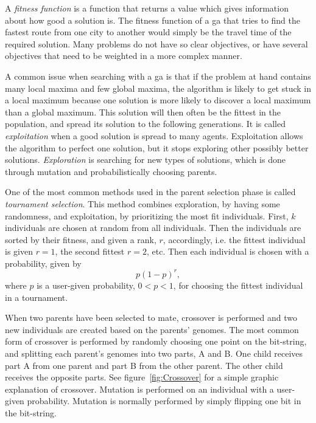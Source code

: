 A \textit{fitness function} is a function that returns a value which gives information about how good a solution is. The fitness function of a \ac{ga} that tries to find the fastest route from one city to another would simply be the travel time of the required solution. Many problems do not have so clear objectives, or have several objectives that need to be weighted in a more complex manner.

A common issue when searching with a \ac{ga} is that if the problem at hand contains many local maxima and few global maxima, the algorithm is likely to get stuck in a local maximum because one solution is more likely to discover a local maximum than a global maximum. This solution will then often be the fittest in the population, and spread its solution to the following generations. It is called \textit{exploitation} when a good solution is spread to many agents. Exploitation allows the algorithm to perfect one solution, but it stops exploring other possibly better solutions. \textit{Exploration} is searching for new types of solutions, which is done through mutation and probabilistically choosing parents. 

One of the most common methods used in the parent selection phase is called \textit{tournament selection}. This method combines exploration, by having some randomness, and exploitation, by prioritizing the most fit individuals. First, $k$ individuals are chosen at random from all individuals. Then the individuals are sorted by their fitness, and given a rank, $r$, accordingly, i.e. the fittest individual is given $r=1$, the second fittest $r=2$, etc. Then each individual is chosen with a probability, given by
\begin{equation}
p(1-p)^r,
\end{equation}
where $p$ is a user-given probability, $0 < p < 1$, for choosing the fittest individual in a tournament. 

When two parents have been selected to mate, crossover is performed and two new individuals are created based on the parents' genomes. The most common form of crossover is performed by randomly choosing one point on the bit-string, and splitting each parent's genomes into two parts, A and B. One child receives part A from one parent and part B from the other parent. The other child receives the opposite parts. See figure~\ref{fig:Crossover} for a simple graphic explanation of crossover. Mutation is performed on an individual with a user-given probability. Mutation is normally performed by simply flipping one bit in the bit-string.

